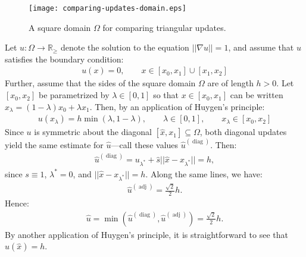 \documentclass{article}
\begin{document}
\begin{figure}[h]
  \centering
  \texttt{[image: comparing-updates-domain.eps]}
  \caption{A square domain $\Omega$ for comparing triangular
    updates.}\label{fig:comparing-updates-domain}
\end{figure}

Let $u : \Omega \to \mathbb{R}_{\geq}$ denote the solution to the
equation $||\nabla u|| = 1$, and assume that $u$ satisfies the
boundary condition:
\begin{align}
  u(x) = 0, \qquad x \in [x_0, x_1] \cup [x_1, x_2]
\end{align}
Further, assume that the sides of the square domain $\Omega$ are of
length $h > 0$. Let $[x_0, x_2]$ be parametrized by
$\lambda \in [0, 1]$ so that $x \in [x_0, x_1]$ can be written
$x_\lambda = (1 - \lambda) x_0 + \lambda x_1$. Then, by an application of Huygen's
principle:
\begin{align}
  u(x_\lambda) = h \min(\lambda, 1 - \lambda), \qquad \lambda \in [0, 1], \qquad x_\lambda \in [x_0, x_2]
\end{align}
Since $u$ is symmetric about the diagonal
$[\hat{x}, x_1] \subseteq \Omega$, both diagonal updates yield the
same estimate for $\hat{u}$---call these values
$\hat{u}^{(\operatorname{diag})}$. Then:
\begin{align}
  \hat{u}^{(\operatorname{diag})} = u_{\lambda^*} + \hat{s} ||\hat{x} - x_{\lambda^*}|| = h,
\end{align}
since $s \equiv 1$, $\lambda^* = 0$, and
$||\hat{x} - x_{\lambda^*}|| = h$. Along the same lines, we have:
\begin{align}
  \hat{u}^{(\operatorname{adj})} = \frac{\sqrt{2}}{2} h.
\end{align}
Hence:
\begin{align}
  \hat{u} = \min(\hat{u}^{(\operatorname{diag})}, \hat{u}^{(\operatorname{adj})}) = \frac{\sqrt{2}}{2} h.
\end{align}
By another application of Huygen's principle, it is straightforward to
see that $u(\hat{x}) = h$.
\end{document}
